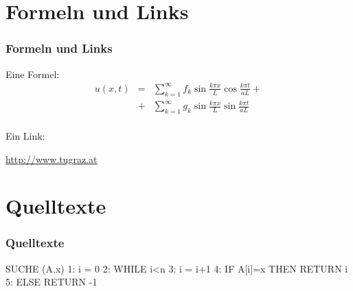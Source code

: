 \section{Formeln und Links}
\begin{frame}
	\frametitle{Formeln und Links}
	Eine Formel:
	\begin{eqnarray*}
	u(x,t) & = & \sum_{k=1}^{\infty} f_k \sin \frac{k \pi x}{L} \cos 
				 \frac{k \pi t}{aL} + \\
		   & + & \sum_{k=1}^{\infty} g_k \sin \frac{k \pi x}{L} \sin 
				 \frac{k \pi t}{aL} \\
	\end{eqnarray*}

	Ein Link:
	\begin{center}
		\url{http://www.tugraz.at}		
	\end{center}
\end{frame}

\section{Quelltexte}
\begin{frame}[fragile]
	\frametitle{Quelltexte}
	\begin{spacing}{1}
	\begin{semiverbatim}
SUCHE (A,x)
1: i = 0
2: WHILE i<n
3:     i = i+1
4:     \alert{IF A[i]=x THEN RETURN i}
5: ELSE RETURN -1
	\end{semiverbatim}
	\end{spacing}
\end{frame}


